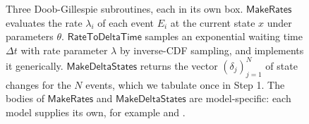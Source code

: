 \begin{figure}[htbp]
\centering
{\footnotesize
{}\hfill
\adjustbox{valign=t}{\fbox{\procedure{$\textsf{RateToDeltaTime}(\lambda) \to \Delta t$:}{
\pcind \pcif \lambda \leq 0 \pcthen \textbf{error}\,; \\
\pcind V \sim \mathrm{Uniform}(0,1]\,; \\
\pcind \pcreturn -\ln(V)/\lambda
}}}\hfill
{}\par}
\caption{Three Doob-Gillespie subroutines, each in its own box. $\textsf{MakeRates}$ evaluates the rate $\lambda_i$ of each event $E_i$ at the current state $x$ under parameters $\theta$. $\textsf{RateToDeltaTime}$ samples an exponential waiting time $\Delta t$ with rate parameter $\lambda$ by inverse-CDF sampling, and \RateToDeltaTime{} implements it generically. $\textsf{MakeDeltaStates}$ returns the vector $(\delta_j)_{j=1}^{N}$ of state changes for the $N$ events, which we tabulate once in Step 1. The bodies of $\textsf{MakeRates}$ and $\textsf{MakeDeltaStates}$ are model-specific: each model supplies its own, for example \MakeLogisticRates{} and \MakeLogisticDeltaStates.}
\label{fig:dg_subroutines_a}
\end{figure}

